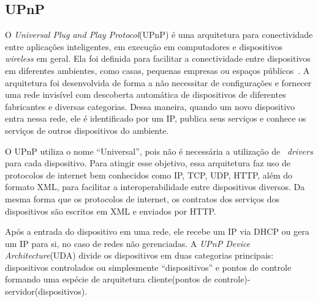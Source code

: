 \subsection{UPnP}
O \emph{Universal Plug and Play Protocol}(UPnP) é uma arquitetura para conectividade entre aplicações inteligentes, em execução em computadores e dispositivos \emph{wireless} em geral. Ela foi definida para facilitar a conectividade entre dispositivos em diferentes ambientes, como casas, pequenas empresas ou espaços públicos~\cite{upnpArch}. A arquitetura foi desenvolvida de forma a não necessitar de configurações e fornecer uma rede invisível com descoberta automática de dispositivos de diferentes fabricantes e diversas categorias. Dessa maneira, quando um novo dispositivo entra nessa rede, ele é identificado por um IP, publica seus serviços e conhece os serviços de outros dispositivos do ambiente. 

O UPnP utiliza o nome ``Universal'', pois não é necessária a utilização de ~\emph{drivers} para cada dispositivo. Para atingir esse objetivo, essa arquitetura faz uso de protocolos de internet bem conhecidos como IP, TCP, UDP, HTTP, além do formato XML, para facilitar a interoperabilidade entre dispositivos diversos. Da mesma forma que os protocolos de internet, os contratos dos serviços dos dispositivos são escritos em XML e enviados por HTTP.

Após a entrada do dispositivo em uma rede, ele recebe um IP via DHCP ou gera um IP para si, no caso de redes não gerenciadas. A \emph{UPnP Device Architecture}(UDA) divide os dispositivos em duas categorias principais: dispositivos controlados ou simplesmente ``dispositivos'' e pontos de controle~\cite{upnpArch} formando uma espécie de arquitetura cliente(pontos de controle)-servidor(dispositivos). 

\begin{comment}	
Quando um dispositivo entra na rede UPnP, ele comunica seus serviços para os pontos de controle ou, caso seja um ponto de controle, o protocolo de descoberta do UPnP permite que ele procure dispositivos de seu interesse. O segundo passo é o envio da descrição detalhada do dispositivo para os pontos de controle, que de posse dessa descrição podem enviar mensagens de controle para o dispositivo(passo 3). Os pontos de controle podem também assinar um contrato para envio de notificações de evento utilizando algum dos serviços que o dispositivo provê(passo 4). O último passo é de apresentação. Caso o dispositivo possua uma URL de apresentação é possível abrir uma página \emph{web} no \emph{browser} e um usuário pode controlar o dispositivo por meio dessa página~\cite{upnpArch}.
\end{comment}


